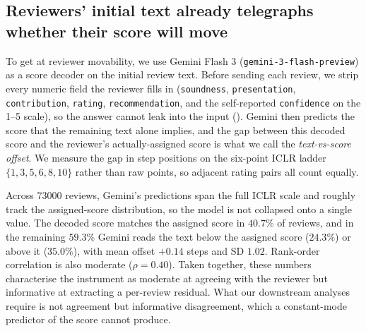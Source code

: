 \documentclass{article}
\newcommand{\code}[1]{\texttt{#1}}
\begin{document}
\subsection{Reviewers' initial text already telegraphs whether their score will move}\label{res:instrument}

%

To get at reviewer movability, we use Gemini Flash 3 (\code{gemini-3-flash-preview}) as a score decoder on the initial review text. Before sending each review, we strip every numeric field the reviewer fills in (\code{soundness}, \code{presentation}, \code{contribution}, \code{rating}, \code{recommendation}, and the self-reported \code{confidence} on the 1--5 scale), so the answer cannot leak into the input (). Gemini then predicts the score that the remaining text alone implies, and the gap between this decoded score and the reviewer's actually-assigned score is what we call the \emph{text-vs-score offset}. We measure the gap in step positions on the six-point ICLR ladder $\{1, 3, 5, 6, 8, 10\}$ rather than raw points, so adjacent rating pairs all count equally.

Across \num{73000} reviews, Gemini's predictions span the full ICLR scale and roughly track the assigned-score distribution, so the model is not collapsed onto a single value. The decoded score matches the assigned score in $40.7\%$ of reviews, and in the remaining $59.3\%$ Gemini reads the text below the assigned score ($24.3\%$) or above it ($35.0\%$), with mean offset $+0.14$ steps and SD $1.02$. Rank-order correlation is also moderate ($\rho = 0.40$). Taken together, these numbers characterise the instrument as moderate at agreeing with the reviewer but informative at extracting a per-review residual. What our downstream analyses require is not agreement but informative disagreement, which a constant-mode predictor of the score cannot produce.
\end{document}
